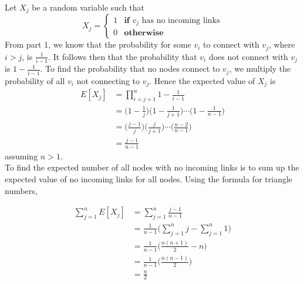\documentclass[11pt]{scrartcl}
\begin{document}
Let $X_j$ be a random variable such that
$$
X_j = 
\begin{cases}
	1 & \textbf{if }  v_j \text{ has no incoming links} \\
	0 & \textbf{otherwise}
\end{cases}
$$
From part 1, we know that the probability for some $v_i$ to connect 
with $v_j$, where $i>j$, is $\frac{1}{i-1}$. It follows then that the probability that 
$v_i$ does not connect with $v_j$ is $1 - \frac{1}{i-1}$. To find the probability 
that no nodes connect to $v_j$, we multiply the probability of all $v_i$ not connecting 
to $v_j$. Hence the expected value of $X_j$ is
\begin{align*}
	E[X_j] & = \prod_{i = j+1}^n 1 - \frac{1}{i-1} \\
	& =  \Big( 1 - \frac{1}{j} \Big) \Big( 1 - \frac{1}{j+1} \Big) \cdots \Big( 1 - \frac{1}{n-1} \Big) \\
	& =  \Big( \frac{j-1}{j} \Big) \Big( \frac{j}{j+1} \Big) \cdots   \Big( \frac{n-2}{n-1} \Big)\\
	& = \frac{j-1}{n-1}
\end{align*}
assuming $n>1$.\\
To find the expected number of all nodes with no incoming links is to sum up 
the expected value of no incoming links for all nodes. Using the formula for triangle numbers,

\begin{align*}
	\sum_{j=1}^n E[X_j] & = \sum_{j=1}^n \frac{j-1}{n-1} \\
	& = \frac{1}{n-1} \Big( \sum_{j=1}^n j - \sum_{j=1}^n 1 \Big) \\
	& = \frac{1}{n-1}  \Big( \frac{n(n+1)}{2} - n \Big)\\
	& = \frac{1}{n-1}  \Big( \frac{n(n-1)}{2}  \Big)\\
	& = \frac{n}{2}
\end{align*}
\end{document}
